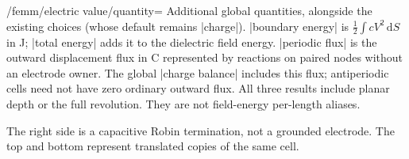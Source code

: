 \begin{key}{/femm/electric value/quantity=}
Additional global quantities, alongside the existing choices (whose default
remains |charge|). |boundary energy| is $\tfrac12\int cV^2\,\mathrm dS$ in J;
|total energy| adds it to the dielectric field energy. |periodic flux| is the
outward displacement flux in C represented by reactions on paired nodes
without an electrode owner. The global |charge balance| includes this flux;
antiperiodic cells need not have zero ordinary outward flux. All three results
include planar depth or the full revolution. They are not field-energy
per-length aliases.
\end{key}

\Needspace{11cm}
\begin{codeexample}[width=0pt]
\end{codeexample}
The right side is a capacitive Robin termination, not a grounded electrode.
The top and bottom represent translated copies of the same cell.

